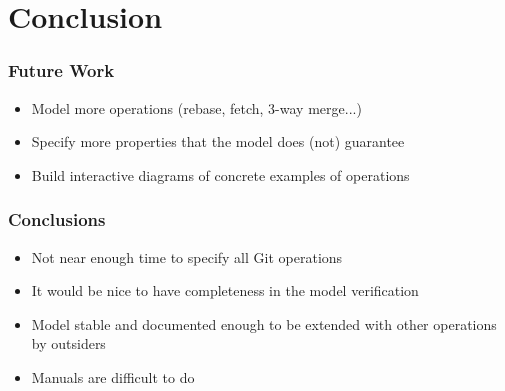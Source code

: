 \documentclass{beamer}
\begin{document}
\section{Conclusion}

\begin{frame}
	\frametitle{Future Work}
	\begin{itemize}
	\item Model more operations (rebase, fetch, 3-way merge...) 
	\item Specify more properties that the model does (not) guarantee
	\item Build interactive diagrams of concrete examples of operations 
	\end{itemize}
\end{frame}

\begin{frame}
	\frametitle{Conclusions}
	\begin{itemize}
	\item Not near enough time to specify all Git operations
	\item It would be nice to have completeness in the model verification
	\item Model stable and documented 
	enough to be extended with other operations by outsiders
	\item Manuals are difficult to do
	\end{itemize}
\end{frame}
\end{document}
